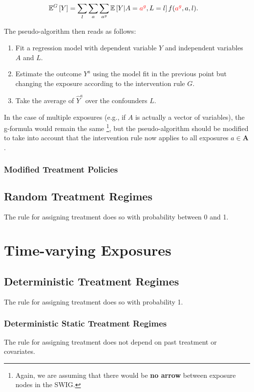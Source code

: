 \documentclass[12pt,twoside]{article}
\begin{document}
\begin{align}
    \mathbb{E}^G \left[ Y \right] &= \sum_l \sum_a \sum_{a^g} \mathbb{E} \left[ Y|A=\textcolor{red}{a^g},L=l\right] f(\textcolor{red}{a^g},a,l).
\end{align}

The pseudo-algorithm then reads as follows:

\begin{enumerate}
    \item Fit a regression model with dependent variable $Y$ and independent variables $A$ and $L$.
    \item Estimate the outcome $Y^a$ using the model fit in the previous point but changing the exposure according to the intervention rule $G$.
    \item Take the average of $\hat{Y}^a$ over the confounders $L$.
\end{enumerate}

In the case of multiple exposures (e.g., if $A$ is actually a vector of variables), the g-formula would remain the same \footnote{Again, we are assuming that there would be \textbf{no arrow} between exposure nodes in the SWIG.}, but the pseudo-algorithm should be modified to take into account that the intervention rule now applies to all exposures $a \in \mathbf{A}$.

\subsubsection{Modified Treatment Policies}

\subsection{Random Treatment Regimes}
The rule for assigning treatment does so with probability between 0 and 1.

\section{Time-varying Exposures}

\subsection{Deterministic Treatment Regimes}
The rule for assigning treatment does so with probability 1.

\subsubsection{Deterministic Static Treatment Regimes}
The rule for assigning treatment does not depend on past treatment or covariates.
\end{document}
